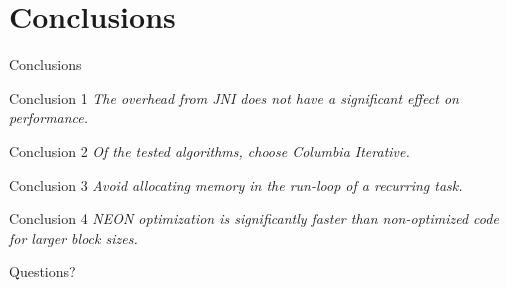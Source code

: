 \documentclass[xcolor={table}]{beamer}
\newcommand{\tikzmark}[1]{\tikz[overlay,remember picture] \node (#1) {};}
\begin{document}
%


\section{Conclusions}
\begin{frame}{Conclusions}
    \begin{block}{Conclusion 1}
        \emph{The overhead from JNI does not have a significant effect on performance.}
    \end{block}
    \begin{block}{Conclusion 2}
        \emph{Of the tested algorithms, choose Columbia Iterative.}
    \end{block}
    \begin{block}{Conclusion 3}
        \emph{Avoid allocating memory in the run-loop of a recurring task.}
    \end{block}
    \begin{block}{Conclusion 4}
        \emph{NEON optimization is significantly faster than non-optimized code for larger block sizes.} %
    \end{block}
\end{frame}

\begin{frame}
    \Huge{\centerline{Questions?}}
\end{frame}
\end{document}
